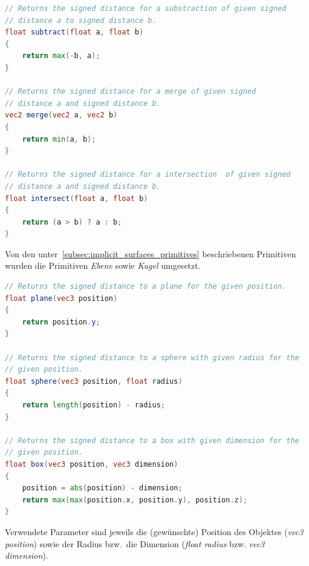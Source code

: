 \begin{minipage}{\linewidth}
\begin{lstlisting}[language=GLSL,caption={Umsetzung der Operationen
        \textit{Vereinigung}, \textit{Subtraktion} sowie
        \textit{Intersektion} für implizite Oberflächen in
        GLSL.},label={alg:glsl_ops},captionpos=b,emph={subtract,merge,intersect}]
// Returns the signed distance for a substraction of given signed
// distance a to signed distance b.
float subtract(float a, float b)
{
    return max(-b, a);
}

// Returns the signed distance for a merge of given signed
// distance a and signed distance b.
vec2 merge(vec2 a, vec2 b)
{
    return min(a, b);
}

// Returns the signed distance for a intersection  of given signed
// distance a and signed distance b.
float intersect(float a, float b)
{
    return (a > b) ? a : b;
}
\end{lstlisting}
\end{minipage}

Von den unter~\autoref{subsec:implicit_surfaces_primitives} beschriebenen
Primitiven wurden die Primitiven \textit{Ebene} sowie \textit{Kugel} umgesetzt.

\begin{minipage}{\linewidth}
\begin{lstlisting}[language=GLSL,caption={Umsetzung der Primitiven
        \textit{Ebene} und \textit{Kugel} in Form von impliziten
        Oberflächen in
        GLSL.},label={alg:glsl_primitives},captionpos=b,emph={plane,sphere,box}]
// Returns the signed distance to a plane for the given position.
float plane(vec3 position)
{
    return position.y;
}

// Returns the signed distance to a sphere with given radius for the
// given position.
float sphere(vec3 position, float radius)
{
    return length(position) - radius;
}

// Returns the signed distance to a box with given dimension for the
// given position.
float box(vec3 position, vec3 dimension)
{
    position = abs(position) - dimension;
    return max(max(position.x, position.y), position.z);
}
\end{lstlisting}
\end{minipage}

Verwendete Parameter sind jeweils die (gewünschte) Position des Objektes
(\textit{vec3 position}) sowie der Radius bzw.\ die Dimension
(\textit{float radius} bzw. \textit{vec3 dimension}).

